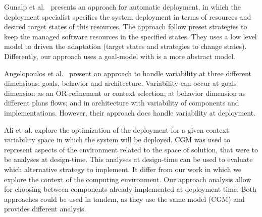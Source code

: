 Gunalp et al.~\citep{gunalp_rondo_2015} presents an approach for automatic deployment, in which the deployment specialist specifies the system deployment in terms of resources and desired target states of this resources. The approach follow preset strategies to keep the managed software resources in the specified states. They uses a low level model to driven the adaptation (target states and strategies to change states). Differently, our approach uses a goal-model with is a more abstract model.

Angelopoulos et al.~\cite{angelopoulos_capturing_2015} present an approach to handle  variability at three different dimensions: goals, behavior and architecture. Variability can occur at goals dimension as an OR-refinement or context selection; at behavior dimension as different plans flows; and in architecture with variability of components and implementations. However, their approach does handle variability at deployment.





Ali et~al.\cite{ali_requirements-driven_2014} explore the optimization of the deployment for a given context variability space in which the system will be deployed. CGM was used to represent aspects of the environment related to the space of solution, that were to be analyses at design-time. This analyses at design-time can be used to evaluate which alternative strategy to implement.
It differ from our work in which we explore the context of the computing environment. Our approach analysis allow for choosing between components already implemented at deployment time. Both approaches could be used in tandem, as they use the same model (CGM) and provides different analysis.



